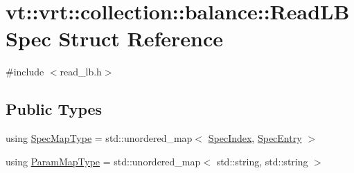 \hypertarget{structvt_1_1vrt_1_1collection_1_1balance_1_1_read_l_b_spec}{}\section{vt\+:\+:vrt\+:\+:collection\+:\+:balance\+:\+:Read\+L\+B\+Spec Struct Reference}
\label{structvt_1_1vrt_1_1collection_1_1balance_1_1_read_l_b_spec}


{\ttfamily \#include $<$read\+\_\+lb.\+h$>$}

\subsection*{Public Types}
\begin{DoxyCompactItemize}
\item 
using \hyperlink{structvt_1_1vrt_1_1collection_1_1balance_1_1_read_l_b_spec_a6b1c83bd61c581d9605941e2381432b9}{Spec\+Map\+Type} = std\+::unordered\+\_\+map$<$ \hyperlink{namespacevt_1_1vrt_1_1collection_1_1balance_a72a5e0d9936ddf57f8e6c64e0e9fd123}{Spec\+Index}, \hyperlink{structvt_1_1vrt_1_1collection_1_1balance_1_1_spec_entry}{Spec\+Entry} $>$
\item 
using \hyperlink{structvt_1_1vrt_1_1collection_1_1balance_1_1_read_l_b_spec_a01c2aa3a9e92be646c37f24afda6afa2}{Param\+Map\+Type} = std\+::unordered\+\_\+map$<$ std\+::string, std\+::string $>$
\end{DoxyCompactItemize}
